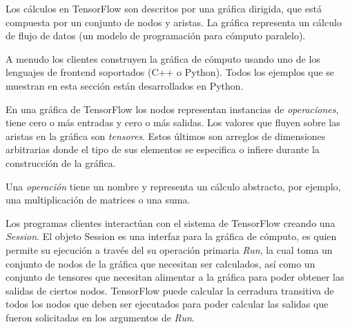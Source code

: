 \begin{remark}
Los cálculos en TensorFlow son descritos por una gráfica dirigida,
que está compuesta por un conjunto de nodos y aristas.
La gráfica representa un cálculo de flujo de datos (un modelo
de programación para cómputo paralelo).
\end{remark}
A menudo los clientes construyen la gráfica de cómputo usando uno de los
lenguajes de frontend soportados (C++ o Python). Todos los ejemplos
que se muestran en esta sección están desarrollados en Python.

En una gráfica de TensorFlow los nodos representan instancias de \textit{operaciones}, tiene cero o más entradas y
cero o más salidas. Los valores que fluyen sobre las aristas en la gráfica son
\textit{tensores}. Estos últimos son arreglos de dimensiones arbitrarias donde el tipo
de sus elementos se especifica o infiere durante la construcción de la gráfica.

Una \textit{operación} tiene un nombre y representa un cálculo abstracto, por ejemplo,
una multiplicación de matrices o una suma. 

Los programas clientes interactúan con el sistema de TensorFlow creando una
\textit{Session}. El objeto Session es una interfaz para la gráfica de cómputo,
es quien permite su ejecución a través del su operación primaria
\textit{Run}, la cual toma un conjunto de nodos de la gráfica que necesitan ser
calculados, así como un conjunto de tensores que necesitan alimentar a la 
gráfica para poder obtener las salidas de ciertos nodos. TensorFlow puede calcular
la cerradura transitiva de todos los nodos que deben ser ejecutados
para poder calcular las salidas que fueron solicitadas en los argumentos de \textit{Run}.

